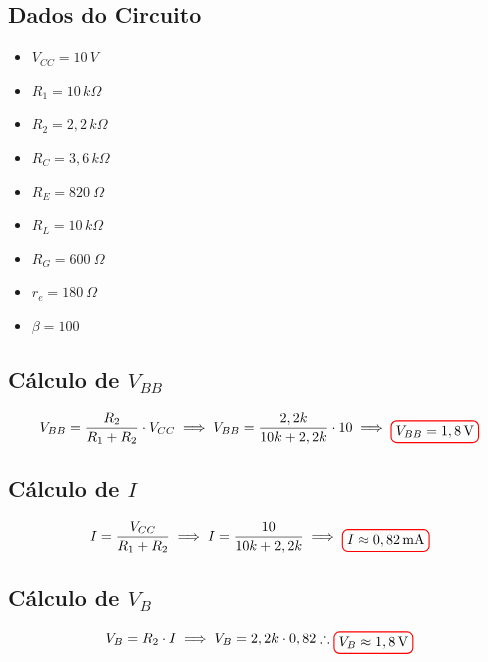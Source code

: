 \documentclass[12pt,openany,oneside,a4paper]{abntex2}
\begin{document}
\subsection{Dados do Circuito}
\begin{itemize}
    \item $V_{CC} = 10\,V$ 
    \item $R_{1} = 10\,{k}\Omega$ 
    \item $R_{2} = 2,2\,{k}\Omega$
    \item $R_{C} = 3,6\,{k}\Omega$
    \item $R_{E} = 820 \ \Omega$
    \item $R_{L} = 10\,{k}\Omega$
    \item $R_{G} = 600 \ \Omega$
    \item $r_{e} = 180 \ \Omega$
    \item $\beta = 100$
\end{itemize}
    
\subsection{Cálculo de $V_{BB}$}
\[
V_{BB} = \frac{R_{2}}{R_{1} + R_{2}} \cdot V_{CC}
\implies
V_{BB} = \frac{2,2k}{10k + 2,2k} \cdot 10
\implies
\tikz[baseline]{\node[draw=red, thick, rounded corners] {$V_{BB} = 1,8\,\text{V}$};}
\]

\subsection{Cálculo de $I$}
\[
I = \frac{V_{CC}}{R_{1} + R_{2}} \implies
I = \frac{10}{10k + 2,2k} \implies
\tikz[baseline]{\node[draw=red, thick, rounded corners] {$I \approx 0,82\,\text{mA}$};}
\]

\subsection{Cálculo de $V_{B}$}
\[
V_{B} = R_{2} \cdot I \implies V_{B} = 2,2k \cdot 0,82 \therefore \tikz[baseline]{\node[draw=red, thick, rounded corners] {$V_{B} \approx 1,8\,\text{V}$};}
\]

\end{document}
